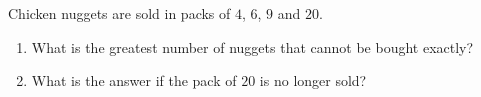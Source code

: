 Chicken nuggets are sold in packs of $4$, $6$, $9$ and $20$.
\begin{enumerate}
\item[(a)] What is the greatest number of nuggets that cannot be bought exactly?
\item[(b)] What is the answer if the pack of $20$ is no longer sold?
\end{enumerate}

